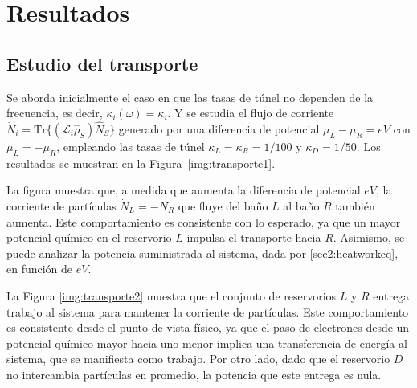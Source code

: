 \label{sec5:modelo}

\newpage

\section{Resultados}

\subsection{Estudio del transporte}
Se aborda inicialmente el caso en que las tasas de túnel no dependen de la frecuencia, es decir, $\kappa_{i}(\omega) = \kappa_{i}$. Y se estudia el flujo de corriente $\dot{N}_{i} = \text{Tr}\{(\mathcal{L}_{i}\hat{\rho}_{S})\hat{N}_{S}\}$ generado por una diferencia de potencial $\mu_{L} - \mu_{R} = eV$ con $\mu_{L}=-\mu_{R}$, empleando las tasas de túnel $\kappa_{L} = \kappa_{R} = 1/100$ y $\kappa_{D} = 1/50$. Los resultados se muestran en la Figura~\ref{img:transporte1}.


La figura muestra que, a medida que aumenta la diferencia de potencial \( eV \), la corriente de partículas \( \dot{N}_L = -\dot{N}_R \) que fluye del baño \( L \) al baño \( R \) también aumenta. Este comportamiento es consistente con lo esperado, ya que un mayor potencial químico en el reservorio \( L \) impulsa el transporte hacia \( R \). Asimismo, se puede analizar la potencia suministrada al sistema, dada por \ref{sec2:heatworkeq}, en función de \( eV \).

    
La Figura \ref{img:transporte2} muestra que el conjunto de reservorios \( L \) y \( R \) entrega trabajo al sistema para mantener la corriente de partículas. Este comportamiento es consistente desde el punto de vista físico, ya que el paso de electrones desde un potencial químico mayor hacia uno menor implica una transferencia de energía al sistema, que se manifiesta como trabajo. Por otro lado, dado que el reservorio \( D \) no intercambia partículas en promedio, la potencia que este entrega es nula.

